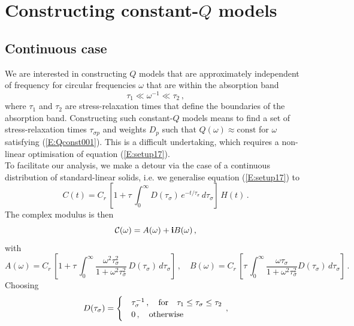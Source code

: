 
\section{Constructing constant-$Q$ models}

\subsection{Continuous case}

We are interested in constructing $Q$ models that are approximately independent of frequency for circular frequencies $\omega$ that are within the absorption band
\begin{equation}\label{E:Qconst001}
\tau_1 \ll \omega^{-1} \ll \tau_2\,,
\end{equation}
where $\tau_1$ and $\tau_2$ are stress-relaxation times that define the boundaries of the absorption band. Constructing such constant-$Q$ models means to find a set of stress-relaxation times $\tau_{\sigma p}$ and weights $D_p$ such that $Q(\omega)\approx \text{const}$ for $\omega$ satisfying (\ref{E:Qconst001}). This is a difficult undertaking, which requires a non-linear optimisation of equation (\ref{E:setup17}).\\
To facilitate our analysis, we make a detour via the case of a continuous distribution of standard-linear solids, i.e. we generalise equation (\ref{E:setup17}) to
\begin{equation}\label{E:Qconst002}
C(t)=C_r\,\left[1+\tau\,\int_{0}^{\infty} D(\tau_\sigma)\,e^{-t/\tau_\sigma}\,d\tau_\sigma \right]\,H(t)\,.
\end{equation}
The complex modulus is then
\begin{equation}\label{E:Qconst004}
\mathcal{C}(\omega)=A(\omega)+\mathbf{i}B(\omega)\,,
\end{equation}
with
\begin{equation}\label{E:Qconst005}
A(\omega)=C_r\,\left[1+\tau\,\int_0^\infty \frac{\omega^2 \tau_\sigma^2}{1+\omega^2\tau_\sigma^2}\,D(\tau_\sigma)\,d\tau_\sigma \right]\,,\quad B(\omega)=C_r\,\left[\tau\,\int_0^\infty \frac{\omega\tau_\sigma}{1+\omega^2\tau_\sigma^2} D(\tau_\sigma)\,d\tau_\sigma   \right]\,.
\end{equation}
Choosing
\begin{equation}\label{E:Qconst006}
D(\tau_\sigma)=\begin{cases}
&\tau_\sigma^{-1}\,,\quad \text{for}\quad \tau_1\leq\tau_\sigma\leq\tau_2\notag\\
& 0\,,\quad \text{otherwise} \end{cases}\,,
\end{equation}
